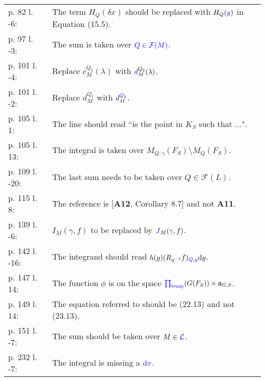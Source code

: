 \documentclass[11pt]{amsart}
\def\FFF{\mathcal F}
\def\LLL{\mathcal L}
\def\aaa{\mathfrak a}
\def\cb#1{{\color{blue}#1}}
\def\d{\text d}
\def\bs{\setminus} 			%
\theoremstyle{remark}
\begin{document}
\begin{longtable} {ll}
	p. 82 l. -6: & The term $H_Q(\delta x)$ should be replaced with $H_Q(\cb{y})$ in Equation (15.5). \\[0.5em]
	p. 97 l. -3: & The sum is taken over $\cb{Q \in \FFF(M)}$. \\[0.5em]
	p. 101 l. -4: & Replace $c_M^{Q_2}(\lambda)$ with $\cb{d}_M^{Q_2}(\lambda)$. \\[0.5em]
	p. 101 l. -2: & Replace $d_M^{Q_1}$ with $d_M^{\cb{Q_2}}$. \\[0.5em]
	p. 105 l. 1: & The line should read ``is the point \cb{in} $K_S$ such that $\dots$". \\[0.5em]
	p. 105 l. 13: & The integral is taken over $M_{Q, \gamma}(F_S)\bs M_Q(F_S)$. \\[0.5em]
	p. 109 l. -20: & The last sum needs to be taken over $Q \in \FFF(L)$. \\[0.5em]
	p. 115 l. 8: & The reference is [\textbf{\cb{A12}}, Corollary 8.7] and not \textbf{A11}. \\[0.5em]
	p. 139 l. -6: & $I_M(\gamma, f)$ to be replaced by $\cb{J}_M(\gamma, f)$. \\[0.5em]
	p. 142 l. -16: & The integrand should read $h(y) (R_{y^{-1}}f)_{\cb{Q, y}} \d y$. \\[0.5em]
	p. 147 l. 14: & The function $\phi$ is on the space $\cb{\prod_{\text{temp}}}(G(F_S))\times \aaa_{G, S}$. \\[0.5em]
	p. 149 l. 14: & The equation referred to should be (\cb{22.13}) and not (23.13). \\[0.5em]
	p. 151 l. -7: & The sum should be taken over $M \in \cb{\LLL}$. \\[0.5em]
	p. 232 l. -7: & The integral is missing a $\cb{\d \pi}$. \\[1em]
	
\end{longtable}
\end{document}
